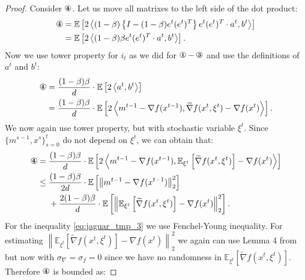 \documentclass{article}
\theoremstyle{plain}
\theoremstyle{definition}
\theoremstyle{remark}
\newcommand{\expect}[1]{\mathbb{E}\left[ #1 \right]}
\newcommand{\norm}[1]{\left\| #1 \right\|}
\newcommand{\EEb}[2]{\mathbb{E}_{#1}\left[ #2 \right]}
\newcommand{\dotprod}[2]{\left\langle #1,#2 \right\rangle}
\newcommand{\circledOne}{\text{\ding{172}}}
\newcommand{\circledThree}{\text{\ding{174}}}
\newcommand{\circledFour}{\text{\ding{175}}}
\begin{document}
\begin{proof}
        Consider $\circledFour$. Let us move all matrixes to the left side of the dot product:
        \begin{align*}
            \circledFour 
            &=
            \expect{2\dotprod{
                (1-\beta)\left\{I - (1-\beta)e^t (e^t)^T \right\} e^t (e^t)^T \cdot a^t
            }{
                b^t
            }}
            \\&=
            \expect{2\dotprod{
                (1-\beta) \beta e^t (e^t)^T \cdot a^t
            }{
                b^t
            }}.
        \end{align*}
        Now we use tower property for $i_t$ as we did for $\circledOne - \circledThree$ and use the definitions of $a^t$ and $b^t$:
        \begin{align*}
            \circledFour 
            &=
            \frac{(1-\beta) \beta}{d} \cdot \expect{2\dotprod{
                a^t
            }{
                b^t
            }}
            \\&=
            \frac{(1-\beta) \beta}{d} \cdot \expect{2\dotprod{
                m^{t-1} - \nabla f(x^{t-1}) 
            }{
                \widetilde{\nabla} f(x^t, \xi^t) - \nabla f(x^t)
            }}.
        \end{align*}
        We now again use tower property, but with stochastic variable $\xi^t$. Since $\{m^{s-1}, x^s\}_{s=0}^t$ do not depend on $\xi^t$, we can obtain that:
        \begin{align}
            \circledFour 
            &=
            \frac{(1-\beta) \beta}{d} \cdot \expect{2\dotprod{
                m^{t-1} - \nabla f(x^{t-1}) 
            }{
                \EEb{\xi^t}{\widetilde{\nabla} f(x^t, \xi^t)} - \nabla f(x^t)
            }}
            \nonumber
            \\&\leq
            \frac{(1-\beta) \beta}{2d} \cdot \expect{\norm{m^{t-1} - \nabla f(x^{t-1})}_2^2}
            \label{eq:jaguar_tmp_3}
            \\&~\quad+
            \frac{2(1-\beta) \beta}{d} \cdot \expect{\norm{\EEb{\xi^t}{\widetilde{\nabla} f(x^t, \xi^t)} - \nabla f(x^t)}_2^2}.
            \nonumber
        \end{align}
        For the inequality \eqref{eq:jaguar_tmp_3} we use Fenchel-Young inequality. For estimating $\norm{\EEb{\xi^t}{\widetilde{\nabla} f(x^t, \xi^t)} - \nabla f(x^t)}_2^2$ we again can use Lemma 4 from \cite{veprikov2024new} but now with $\sigma_\nabla = \sigma_f = 0$ since we have no randomness in $\EEb{\xi^t}{\widetilde{\nabla} f(x^t, \xi^t)}$. Therefore $\circledFour$ is bounded as:

\end{proof}
\end{document}
